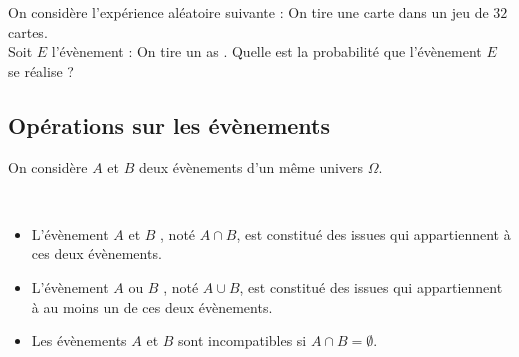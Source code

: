 \begin{Exemple}
On considère l'expérience aléatoire suivante : 
On tire une carte dans un jeu de $32$ cartes.\\
Soit $E$ l'évènement : \og On tire un as \fg{}.
Quelle est la probabilité que l'évènement $E$ se réalise ? 
\vspace{0.3cm}

\ligne

\ligne

\ligne

\ligne

\ligne


\end{Exemple}
\newpage

\subsection{Opérations sur les évènements}
\noindent On considère $A$ et $B$ deux évènements d'un même univers $\Omega$.
\begin{Définition} $ $\\
\begin{itemize}[label=\textcolor{Couleur6}{$\bullet$}]
\item L'évènement \og $A$ et $B$ \fg{}, noté $A\cap B$, est constitué des issues qui appartiennent à ces deux évènements.
\item  L'évènement \og $A$ ou $B$ \fg{}, noté $A\cup B$, est constitué des issues qui appartiennent à au moins un de ces deux évènements.
\item Les évènements $A$ et $B$ sont incompatibles si $A\cap B=\emptyset$.
\end{itemize}

\end{Définition}

